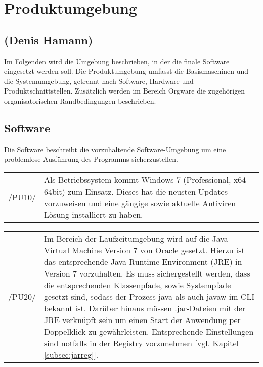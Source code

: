 \section{Produktumgebung}
\label{sec:Produktumgebung}

\subsection*{(Denis Hamann)}

Im Folgenden wird die Umgebung beschrieben, in der die finale Software eingesetzt werden soll.
Die Produktumgebung umfasst die Basismaschinen und die Systemumgebung, getrennt nach Software, Hardware und
Produktschnittstellen. Zusätzlich werden im Bereich Orgware die zugehörigen organisatorischen Randbedingungen beschrieben.

\subsection{Software}
\label{subsec:software}

Die Software beschreibt die vorzuhaltende Software-Umgebung um eine problemlose Ausführung des Programms sicherzustellen.\\

\begin{tabular}{p{1.5cm}p{14.5cm}}

	 /PU10/	&  Als Betriebssystem kommt Windows 7 (Professional, x64 - 64bit) zum Einsatz. Dieses hat die neusten Updates vorzuweisen und eine gängige sowie aktuelle Antiviren Lösung installiert zu haben.\\[0.25cm]

\end{tabular}

\begin{tabular}{p{1.5cm}p{14.5cm}}

	 /PU20/	&  Im Bereich der Laufzeitumgebung wird auf die Java Virtual Machine Version 7 von Oracle gesetzt.
Hierzu ist das entsprechende Java Runtime Environment (JRE) in Version 7 vorzuhalten. Es muss sichergestellt werden, dass die entsprechenden Klassenpfade, sowie Systempfade gesetzt sind, sodass der Prozess java als auch javaw im CLI bekannt ist. Darüber hinaus müssen .jar-Dateien mit der JRE verknüpft sein um einen Start der Anwendung per Doppelklick zu gewährleisten. Entsprechende Einstellungen sind notfalls in der Registry vorzunehmen [vgl. Kapitel \ref{subsec:jarreg}].\\[0.25cm]

\end{tabular}

